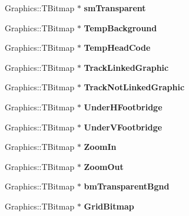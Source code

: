\begin{DoxyCompactItemize}
Graphics\+::\+T\+Bitmap $\ast$ {\bfseries sm\+Transparent}
\item 
\mbox{\label{class_t_rail_graphics_a9a3aaf261fb42df4505b393534b9a3ff}} 
Graphics\+::\+T\+Bitmap $\ast$ {\bfseries Temp\+Background}
\item 
\mbox{\label{class_t_rail_graphics_a17f07d22bdd5633c828ebc93948e0b12}} 
Graphics\+::\+T\+Bitmap $\ast$ {\bfseries Temp\+Head\+Code}
\item 
\mbox{\label{class_t_rail_graphics_a99b1657db6992988185a2add343f2720}} 
Graphics\+::\+T\+Bitmap $\ast$ {\bfseries Track\+Linked\+Graphic}
\item 
\mbox{\label{class_t_rail_graphics_a92ab39af52889438f65beed3a79be3cc}} 
Graphics\+::\+T\+Bitmap $\ast$ {\bfseries Track\+Not\+Linked\+Graphic}
\item 
\mbox{\label{class_t_rail_graphics_ad83df5ce0b92a10abf886ffd2c601e79}} 
Graphics\+::\+T\+Bitmap $\ast$ {\bfseries Under\+H\+Footbridge}
\item 
\mbox{\label{class_t_rail_graphics_a9a82f44b53b28abd305249039ec429b3}} 
Graphics\+::\+T\+Bitmap $\ast$ {\bfseries Under\+V\+Footbridge}
\item 
\mbox{\label{class_t_rail_graphics_af767c8d2a83580c11319d91a0b953f7b}} 
Graphics\+::\+T\+Bitmap $\ast$ {\bfseries Zoom\+In}
\item 
\mbox{\label{class_t_rail_graphics_a19ac80f2d47148d7779f51ea3cdb2d5f}} 
Graphics\+::\+T\+Bitmap $\ast$ {\bfseries Zoom\+Out}
\item 
\mbox{\label{class_t_rail_graphics_a73221925b913fa97dc8110fad0194614}} 
Graphics\+::\+T\+Bitmap $\ast$ {\bfseries bm\+Transparent\+Bgnd}
\item 
\mbox{\label{class_t_rail_graphics_a1f0df1b98460bdc808139160657942aa}} 
Graphics\+::\+T\+Bitmap $\ast$ {\bfseries Grid\+Bitmap}
\item 
\mbox{\label{class_t_rail_graphics_aeedc3059c2ad34ce57c36c9db27aa089}} 

\end{DoxyCompactItemize}
